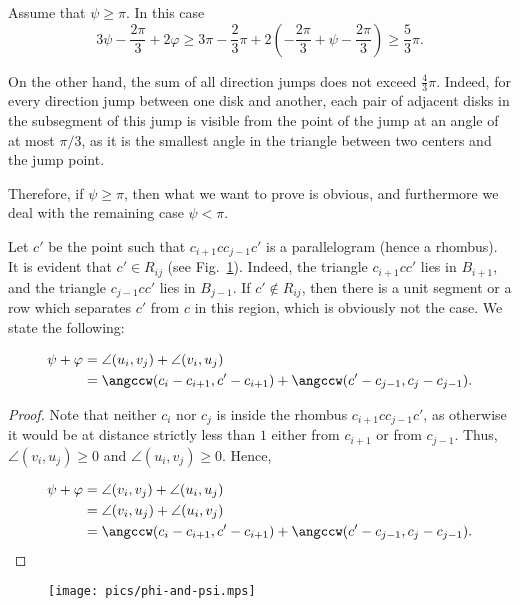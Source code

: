 \begin{enumerate}[label={\bf Case \arabic*: }, wide, labelwidth=!, labelindent=0pt]
Assume that $\psi\geq\pi$. In this case
$$3\psi - \frac{2\pi}{3} + 2\varphi\geq 3\pi - \frac23\pi + 2\left(-\frac{2\pi}{3} + \psi - \frac{2\pi}{3}\right)\geq \frac53\pi.$$

On the other hand, the sum of all direction jumps does not exceed $\frac43\pi$. Indeed, for every direction jump between one disk and another, each pair of adjacent disks in the subsegment of this jump is visible from the point of the jump at an angle of at most $\pi/3$, as it is the smallest angle in the triangle between two centers and the jump point.

Therefore, if $\psi\geq\pi$, then what we want to prove is obvious, and furthermore we deal with the remaining case $\psi < \pi$.

Let $c'$ be the point such that $c_{i+1}cc_{j-1}c'$ is a parallelogram (hence a rhombus). It is evident that $c'\in R_{ij}$ (see Fig.~\ref{fig:phi-and-psi}). Indeed, the triangle $c_{i+1}cc'$ lies in $B_{i+1}$, and the triangle $c_{j-1}cc'$ lies in $B_{j-1}$. If $c'\notin R_{ij}$, then there is a unit segment or a row which separates $c'$ from $c$ in this region, which is obviously not the case. We state the following:

\begin{observation}
\begin{align*}
\psi + \varphi & = \angle(u_i, v_j) + \angle(v_i, u_j) \\
& = \angccw(c_i - c_{i+1}, c' - c_{i+1}) + \angccw(c' - c_{j-1}, c_j - c_{j-1}).    
\end{align*}

\end{observation}

\begin{proof}
Note that neither $c_i$ nor $c_j$ is inside the rhombus $c_{i+1}cc_{j-1}c'$, as otherwise it would be at distance strictly less than $1$ either from $c_{i+1}$ or from $c_{j-1}$. Thus, $\angle(v_i, u_j)\geq 0$ and $\angle(u_i, v_j)\geq 0$. Hence,

\begin{align*}
\psi + \varphi & = \angle(v_i, v_j) + \angle(u_i, u_j) \\ &= \angle(v_i, u_j) + \angle(u_i, v_j) \\
&= \angccw(c_i - c_{i+1}, c' - c_{i+1}) + \angccw(c' - c_{j-1}, c_j - c_{j-1}).
\end{align*}
\end{proof}


\begin{figure}[h!]
    \centering
    \texttt{[image: pics/phi-and-psi.mps]}
    \caption{}
    \label{fig:phi-and-psi}
\end{figure}


\end{enumerate}
